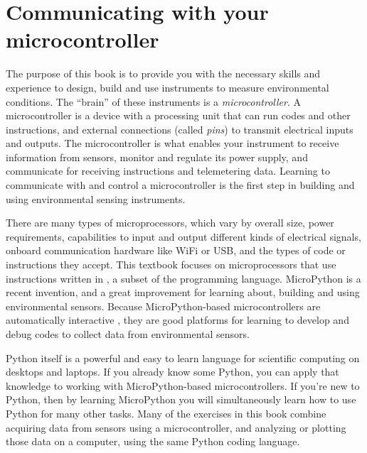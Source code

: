 \setchapterpreamble[u]{\margintoc}
\chapter{Communicating with your microcontroller}

The purpose of this book is to provide you with the necessary skills and experience to design, build and use instruments to measure environmental conditions. 
The ``brain'' of these instruments is a \emph{microcontroller}.
A microcontroller is a device with a processing unit that can run codes and other instructions, and external connections (called \emph{pins}) to transmit electrical inputs and outputs. 
The microcontroller is what enables your instrument to receive information from sensors, monitor and regulate its power supply, and communicate for receiving instructions and telemetering data. 
Learning to communicate with and control a microcontroller is the first step in building and using environmental sensing instruments. 

There are many types of microprocessors, which vary by overall size, power requirements, capabilities to input and output different kinds of electrical signals, onboard communication hardware like WiFi or USB, and the types of code or instructions they accept. 
%
This textbook focuses on microprocessors that use instructions written in , a subset of the  programming language.
MicroPython is a recent invention, and a great improvement for learning about, building and using environmental sensors.
Because MicroPython-based microcontrollers are automatically interactive
, they are good platforms for learning to develop and debug codes to collect data from environmental sensors.  

Python itself is a powerful and easy to learn language for scientific computing on desktops and laptops. 
If you already know some Python, you can apply that knowledge to working with MicroPython-based microcontrollers. 
If you're new to Python, then by learning MicroPython you will simultaneously learn how to use Python for many other tasks. 
Many of the exercises in this book combine acquiring data from sensors using a microcontroller, and analyzing or plotting those data on a computer, using the same Python coding language.

